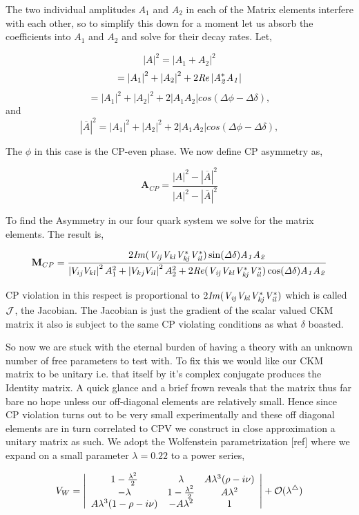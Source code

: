 \documentclass[floatfix,aps,prd,amsmath,amssymb]{revtex4}
\begin{document}
The two individual amplitudes $A_1$ and $A_2$ in each of the Matrix elements interfere with each other, so to simplify this down for a moment let us absorb the coefficients into $A_1$ and $A_2$ and solve for their decay rates. 
Let,

\[ \left|A\right|^2 = \left| A_1 +A_2 \right|^2\]
\[=\left|  A_1 \right|^2+ \left| A_2 \right|^2 +2\it{R} e\left| A^*_2 A_1 \right| \]
\[=\left| A_1 \right|^2 + \left| A_2 \right|^2 +2\left|A_1 A_2 \right| cos(\Delta \phi - \Delta\delta),\] and
\[\left| \overline{A}\right|^2 =\left| A_1 \right|^2+ \left| A_2 \right|^2 +2\left| A_1 A_2 \right| cos(\Delta \phi - \Delta\delta),\]

The $\phi$ in this case is the CP-even phase. We now define CP asymmetry as,

\[\mathbf{A}_{CP} = \frac{\left|A\right|^2-\left|\overline{A}\right|^2}{\left|A\right|^2-\left|\overline{A}\right|^2}\]

To find the Asymmetry in our four quark system we solve for the matrix elements. The result is,

\[ \mathbf{M}_{CP}= \frac{ 2\it{I}m (V_{ij} V_{kl} V^{*}_{kj }V^{*}_{il} )\sin(\Delta\delta) A_{1} A_{2}}{\left| V_{ij} V_{kl}\right|^2 A^{2}_{1} + \left|V_{kj}V_{il}\right|^2 A^{2}_{2} +2 \it{R} e (V_{ij} V_{kl} V^{*}_{kj} V^{*}_{il} ) \cos(\Delta\delta)A_1 A_2} \]

CP violation in this respect is proportional to $2\it{I}m(V_{ij}V_{kl}V^{*}_{kj}V^{*}_{il})$ which is called $\cal{J}$, the Jacobian. The Jacobian is just the gradient of the scalar valued CKM matrix it also is subject to the same CP violating conditions as what $\delta$ boasted.

So now we are stuck with the eternal burden of having a theory with an unknown number of free parameters to test with. To fix this we would like our CKM matrix to be unitary i.e. that itself by it's complex conjugate produces the Identity matrix. A quick glance and a brief frown reveals that the matrix thus far bare no hope unless our off-diagonal elements are relatively small. Hence since CP violation turns out to be very small experimentally and these off diagonal elements are in turn correlated to CPV we construct in close approximation a unitary matrix as such. We adopt the Wolfenstein parametrization [ref] where we expand on a small parameter $\lambda = 0.22$ to a power series,

\[ V_{W} =\left| \begin{array}{ccc} 1-\frac{\lambda^2}{2} & \lambda & A\lambda^3(\rho-i\nu) \\ -\lambda & 1-\frac{\lambda^2}{2} & A\lambda^2 \\ A\lambda^3(1-\rho-i\nu) &  -A\lambda^2 & 1 \end{array}\right| + \cal{O}(\lambda^4)\]
\end{document}
